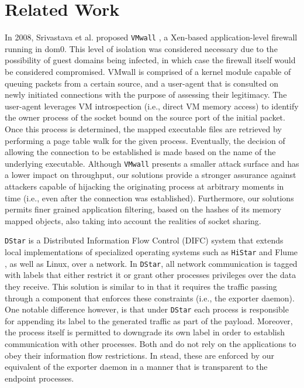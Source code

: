 \section{Related Work}
\label{appfw:relwork}

In 2008, Srivastava et al. proposed \texttt{VMwall} \cite{srivastava2008tamper}, a Xen-based application-level firewall running in dom0. This level of isolation was considered necessary due to the possibility of guest domains being infected, in which case the firewall itself would be considered compromised. VMwall is comprised of a kernel module capable of queuing packets from a certain source, and a user-agent that is consulted on newly initiated connections with the purpose of assessing their legitimacy. The user-agent leverages VM introspection (i.e., direct VM memory access) to identify the owner process of the socket bound on the source port of the initial packet. Once this process is determined, the mapped executable files are retrieved by performing a page table walk for the given process. Eventually, the decision of allowing the connection to be established is made based on the name of the underlying executable. Although \texttt{VMwall} presents a smaller attack surface and has a lower impact on throughput, our solutions provide a stronger assurance against attackers capable of hijacking the originating process at arbitrary moments in time (i.e., even after the connection was established). Furthermore, our solutions permits finer grained application filtering, based on the hashes of its memory mapped objects, also taking into account the realities of socket sharing.

\texttt{DStar} \cite{zeldovich2008securing} is a Distributed Information Flow Control (DIFC) system that extends local implementations of specialized operating systems such as \texttt{HiStar} \cite{zeldovich2011making} and Flume \cite{krohn2007information}, as well as Linux, over a network. In \texttt{DStar}, all network communication is tagged with labels that either restrict it or grant other processes privileges over the data they receive. This solution is similar to \daf{} in that it requires the traffic passing through a component that enforces these constraints (i.e., the exporter daemon). One notable difference however, is that under \texttt{DStar} each process is responsible for appending its label to the generated traffic as part of the payload. Moreover, the process itself is permitted to downgrade its own label in order to establish communication with other processes. Both \daf{} and \scout{} do not rely on the applications to obey their information flow restrictions. In stead, these are enforced by our equivalent of the exporter daemon in a manner that is transparent to the endpoint processes.

